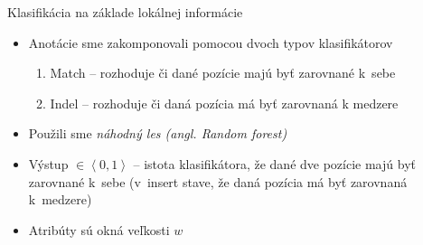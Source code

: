 \documentclass[xcolor=dvipsnames, compress, 12pt]{beamer}
\theoremstyle{definition}
\begin{document}
\begin{frame}{Klasifikácia na základe lokálnej informácie}
\begin{itemize}
  \item Anotácie sme zakomponovali pomocou dvoch typov klasifikátorov
  \begin{enumerate}
    \item Match -- rozhoduje či dané pozície majú byť zarovnané k~sebe
    \item Indel -- rozhoduje či daná pozícia má byť zarovnaná k medzere
  \end{enumerate}
  \item Použili sme \emph{náhodný les (angl. Random forest)} \cite{randomForestPaper}
  \item Výstup $\in \left<0,1\right>$ -- istota klasifikátora, že dané dve pozície majú byť zarovnané k~sebe (v~insert stave, že daná pozícia má  byť zarovnaná k~medzere)
  \item Atribúty sú okná veľkosti $w$
\end{itemize}
\end{frame}
\end{document}
